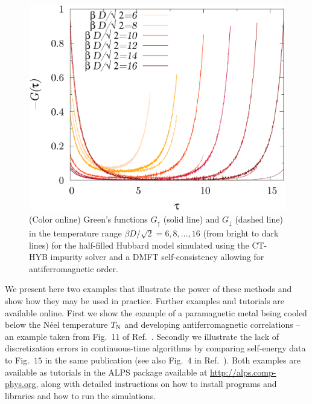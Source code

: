 \documentclass[3p,twocolumn]{elsarticle}
\begin{document}
\begin{figure}
\includegraphics[width=0.9\columnwidth]{green.eps}
\caption{(Color online)
Green's functions $G_{\uparrow}$ (solid line) and $G_{\downarrow}$
(dashed line) in the temperature range $\beta D/\sqrt 2 =6,8,...,16$
(from bright to dark lines) for the half-filled Hubbard model
simulated using the CT-HYB impurity solver and a DMFT self-consistency allowing for antiferromagnetic order.  
}
\label{fig:hyb1}
\end{figure}
We present here two examples that illustrate the power of these methods and show how they may be used in practice. Further examples and tutorials are available online. First we show the example of a paramagnetic metal being cooled below the N\'{e}el temperature $T_{\rm N}$ and developing antiferromagnetic correlations -- an example taken from Fig.~11 of Ref.~\cite{Georges96}. Secondly we illustrate the lack of discretization errors in continuous-time algorithms by comparing self-energy data to Fig.~$15$ in the same publication (see also Fig.~$4$ in Ref.~\cite{Gull08_ctaux}). Both examples are available as tutorials in the ALPS package available at \href{http://alps.comp-phys.org}{http://alps.comp-phys.org}, along with detailed instructions on how to install programs and libraries and how to run the simulations. 
\end{document}
